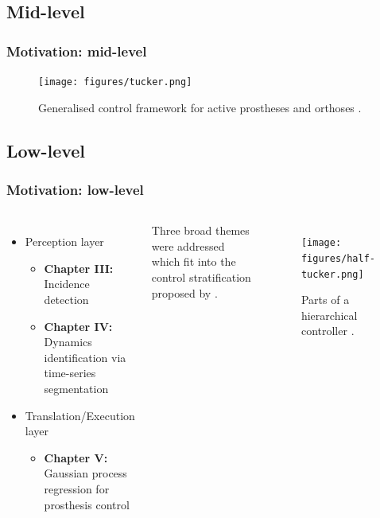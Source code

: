 \documentclass[aspectratio=169]{beamer}
\begin{document}

\begin{frame}[plain]
    \subsection{Mid-level}
    \frametitle{Motivation: mid-level}
    \begin{figure}
        \centering
        \texttt{[image: figures/tucker.png]}
        \caption{Generalised control framework for active prostheses and orthoses \citep{tucker2015control}.}
    \end{figure}
\end{frame}


\begin{frame}
    \subsection{Low-level}
    \frametitle{Motivation: low-level}
    \begin{columns}[t] %
        \begin{itemize}
            \item Perception layer 
                \begin{itemize}
                    \item {\bf Chapter III:} Incidence detection 
                    \item {\bf Chapter IV:} Dynamics identification via time-series segmentation
                \end{itemize}
            \item Translation/Execution layer 
                \begin{itemize}
                    \item {\bf Chapter V:} Gaussian process regression for prosthesis control 
                \end{itemize}
        \end{itemize}

        Three broad themes were addressed which fit into the control stratification proposed by
        \citet{tucker2015control}.

        \begin{figure}[ht]
            \centering
            \texttt{[image: figures/half-tucker.png]}
            \caption{Parts of a hierarchical controller \citep{tucker2015control}.}
        \end{figure}
    \end{columns}
\end{frame}
\end{document}
